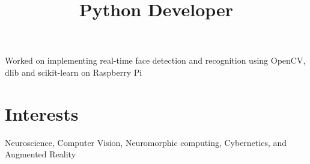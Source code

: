 \documentclass[margin]{res}
\begin{document}
\begin{resume}
      \title{\textbf{Python Developer}}
      \begin{position}
        Worked on implementing real-time face detection and recognition using OpenCV, dlib and scikit-learn on Raspberry Pi
      \end{position}


    \section{Interests}
      Neuroscience, Computer Vision, Neuromorphic computing, Cybernetics, and Augmented Reality

  \end{resume}
\end{document}
